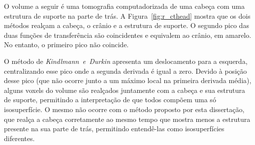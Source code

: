 %
	O volume a seguir é uma tomografia computadorizada de uma cabeça com uma estrutura de suporte na parte de trás. A Figura~\ref{fig:r_cthead} mostra que os dois métodos realçam a cabeça, o crânio e a estrutura de suporte. O segundo pico das duas funções de transferência são coincidentes e equivalem ao crânio, em amarelo. No entanto, o primeiro pico não coincide.
	
	O método de \textit{Kindlmann~e~Durkin} apresenta um deslocamento para a esquerda, centralizando esse pico onde a segunda derivada é igual a zero. Devido à posição desse pico (que não ocorre junto a um máximo local na primeira derivada média), alguns voxels do volume são realçados juntamente com a cabeça e sua estrutura de suporte, permitindo a interpretação de que todos compõem uma só isosuperfície. O mesmo não ocorre com o método proposto por esta dissertação, que realça a cabeça corretamente ao mesmo tempo que mostra menos a estrutura presente na sua parte de trás, permitindo entendê-las como isosuperfícies diferentes.

